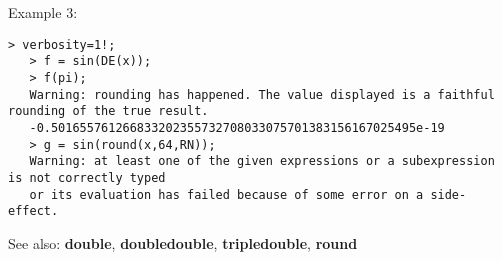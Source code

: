 \noindent Example 3: 
\begin{center}\begin{minipage}{14.8cm}\begin{Verbatim}[frame=single]
   > verbosity=1!;
   > f = sin(DE(x));
   > f(pi);
   Warning: rounding has happened. The value displayed is a faithful rounding of the true result.
   -0.501655761266833202355732708033075701383156167025495e-19
   > g = sin(round(x,64,RN));
   Warning: at least one of the given expressions or a subexpression is not correctly typed
   or its evaluation has failed because of some error on a side-effect.
\end{Verbatim}
\end{minipage}\end{center}
See also: \textbf{double}, \textbf{doubledouble}, \textbf{tripledouble}, \textbf{round}
